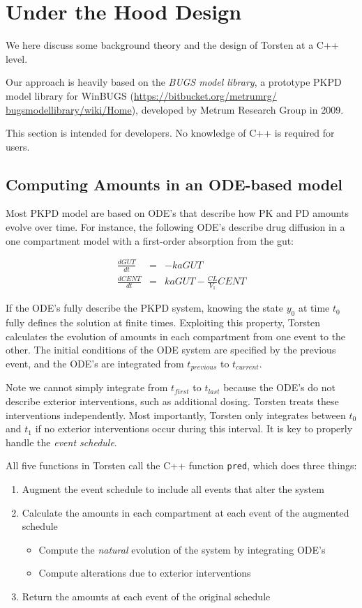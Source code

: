 \documentclass[11pt]{amsart}
\let\oldsection\section
\renewcommand\section{\clearpage\oldsection}
\begin{document}
\section{Under the Hood Design}
We here discuss some background theory and the design of Torsten at a C++ level.

Our approach is heavily based on the \textit{BUGS model library}, a prototype PKPD model library for WinBUGS (\url{https://bitbucket.org/metrumrg/ bugsmodellibrary/wiki/Home}), developed by Metrum Research Group in 2009.

This section is intended for developers. No knowledge of C++ is required for users.


\subsection*{Computing Amounts in an ODE-based model}
Most PKPD model are based on ODE's that describe how PK and PD amounts evolve over time. For instance, the following ODE's describe drug diffusion in a one compartment model with a first-order absorption from the gut:

\begin{eqnarray*}
\frac{dGUT}{dt} &=& -kaGUT \\ 
\frac{dCENT}{dt} &=& kaGUT - \frac{CL}{V_{1}}CENT
\end{eqnarray*}

If the ODE's fully describe the PKPD system, knowing the state $y_0$ at time $t_0$ fully defines the solution at finite times. Exploiting this property, Torsten calculates the evolution of amounts in each compartment from one event to the other. The initial conditions of the ODE system are specified by the previous event, and the ODE's are integrated from $t_{previous} $ to $t_{current}$. 

Note we cannot simply integrate from $t_{first}$ to $t_{last}$ because the ODE's do not describe exterior interventions, such as additional dosing. Torsten treats these interventions independently. Most importantly, Torsten only integrates between $t_0$ and $t_1$ if no exterior interventions occur during this interval. It is key to properly handle the \textit{event schedule}. 

All five functions in Torsten call the C++ function \texttt{pred}, which does three things:
\begin{enumerate}
  \item Augment the event schedule to include all events that alter the system
  \item Calculate the amounts in each compartment at each event of the augmented schedule
  \begin{itemize}
    \item Compute the \textit{natural} evolution of the system by integrating ODE's
    \item Compute alterations due to exterior interventions
  \end{itemize}
  \item Return the amounts at each event of the original schedule
\end{enumerate}
\end{document}
